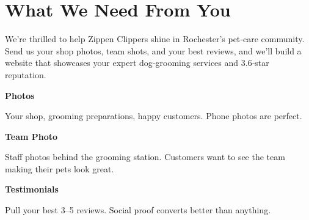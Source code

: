 \documentclass[11pt,letterpaper]{article}
\begin{document}
\vspace{0.2em}

\section*{What We Need From You}

We’re thrilled to help Zippen Clippers shine in Rochester’s pet‑care community. Send us your shop photos, team shots, and your best reviews, and we’ll build a website that showcases your expert dog‑grooming services and 3.6‑star reputation.

\vspace{0.12em}

\noindent\begin{minipage}[t]{0.48\textwidth}
\begin{tcolorbox}[colframe=accent-teal, boxrule=1pt, left=0.7em, right=0.7em, top=0.5em, bottom=0.5em, arc=4pt, boxsep=0pt]
{\bfseries\small\color{accent-teal}Photos}

\vspace{0.15em}

{\small Your shop, grooming preparations, happy customers. Phone photos are perfect.}
\end{tcolorbox}

\vspace{0.1em}

\begin{tcolorbox}[colframe=accent-teal, boxrule=1pt, left=0.7em, right=0.7em, top=0.5em, bottom=0.5em, arc=4pt, boxsep=0pt]
{\bfseries\small\color{accent-teal}Team Photo}

\vspace{0.15em}

{\small Staff photos behind the grooming station. Customers want to see the team making their pets look great.}
\end{tcolorbox}

\vspace{0.1em}

\begin{tcolorbox}[colframe=accent-teal, boxrule=1pt, left=0.7em, right=0.7em, top=0.5em, bottom=0.5em, arc=4pt, boxsep=0pt]
{\bfseries\small\color{accent-teal}Testimonials}

\vspace{0.15em}

{\small Pull your best 3--5 reviews. Social proof converts better than anything.}
\end{tcolorbox}
\end{minipage}
\end{document}
